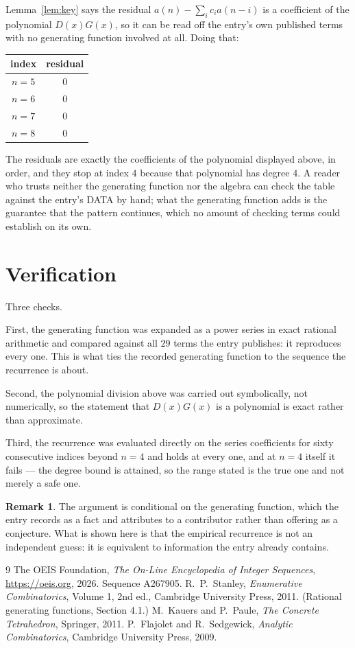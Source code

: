 \documentclass[11pt,a4paper]{article}
\theoremstyle{plain}
\theoremstyle{definition}
\newtheorem{remark}[theorem]{Remark}
\begin{document}
Lemma~\ref{lem:key} says the residual $a(n)-\sum_ic_ia(n-i)$ is a coefficient of the
polynomial $D(x)G(x)$, so it can be read off the entry's own published terms with no
generating function involved at all. Doing that:
\begin{center}
\begin{tabular}{cc}
index & residual \\ \hline
$n=5$ & $0$ \\
$n=6$ & $0$ \\
$n=7$ & $0$ \\
$n=8$ & $0$
\end{tabular}
\end{center}
The residuals are exactly the coefficients of the polynomial displayed above, in order, and
they stop at index $4$ because that polynomial has degree $4$. A reader who trusts
neither the generating function nor the algebra can check the table against the entry's DATA
by hand; what the generating function adds is the guarantee that the pattern continues, which
no amount of checking terms could establish on its own.

\section{Verification}

Three checks.

First, the generating function was expanded as a power series in exact rational arithmetic and
compared against all $29$ terms the entry publishes: it reproduces every one. This is
what ties the recorded generating function to the sequence the recurrence is about.

Second, the polynomial division above was carried out symbolically, not numerically, so the
statement that $D(x)G(x)$ is a polynomial is exact rather than approximate.

Third, the recurrence was evaluated directly on the series coefficients for sixty consecutive
indices beyond $n=4$ and holds at every one, and at $n=4$ itself it fails --- the
degree bound is attained, so the range stated is the true one and not merely a safe one.

\begin{remark}
The argument is conditional on the generating function, which the entry records as a fact and
attributes to a contributor rather than offering as a conjecture. What is shown here is that
the empirical recurrence is not an independent guess: it is equivalent to information the
entry already contains.
\end{remark}

\begin{thebibliography}{9}
 The OEIS Foundation, \emph{The On-Line Encyclopedia of Integer
Sequences}, \url{https://oeis.org}, 2026. Sequence A267905.
 R.~P.~Stanley, \emph{Enumerative Combinatorics}, Volume 1, 2nd ed.,
Cambridge University Press, 2011. (Rational generating functions, Section 4.1.)
 M.~Kauers and P.~Paule, \emph{The Concrete Tetrahedron}, Springer, 2011.
 P.~Flajolet and R.~Sedgewick, \emph{Analytic Combinatorics}, Cambridge
University Press, 2009.
\end{thebibliography}
\end{document}
